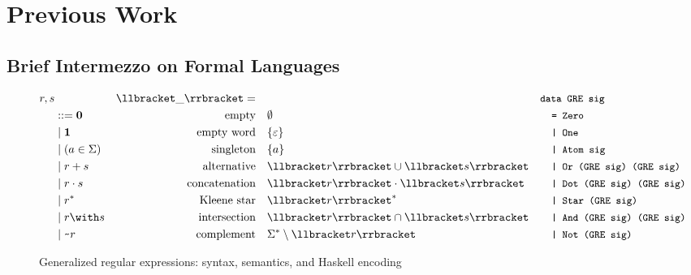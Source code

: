 \section{Previous Work}
\subsection{Brief Intermezzo on Formal Languages}
\label{sec:research-question}

\begin{figure*}[!bt]
  \centering
  \begin{minipage}{1.0\linewidth}
  \begin{align*}
    r, s & \vspace{10cm}\ &\Lang{\_}=\quad &  &
                             \makebox[1em][l]{\code{data GRE sig}}\\
         & ::= \Rnull & \ltext{empty}
                        & \emptyset
                           &&\code{= Zero}\\
         & \mid \Rempty & \ltext{empty word}
                        & \{ \varepsilon \}
                           && \code{| One}\\
         & \mid (a \in \Sigma) & \ltext{singleton}
                        &  \{ a \}
                           && \code{| Atom sig} \\
         & \mid \Runion rs & \ltext{alternative}
                        &  \Lang{r} \cup \Lang{s}
                           && \code{| Or (GRE sig) (GRE sig)}\\
         & \mid \Rconcat rs & \ltext{concatenation}
                        &  \Lang r \cdot \Lang s
                           && \code{| Dot (GRE sig) (GRE sig)}\\
         & \mid \Rstar r & \ltext{Kleene star}
                        & \Lang r^* 
                           && \code{| Star (GRE sig)}\\
         & \mid \Rintersect rs & \ltext{intersection}
                        & \Lang r \cap \Lang s
                           && \code{| And (GRE sig) (GRE sig)}\\
         & \mid \Rcomplement r & \ltext{complement}
                        & \Sigma^* \setminus \Lang r
                           && \code{| Not (GRE sig)}
  \end{align*}
  \end{minipage}
  \caption{Generalized regular expressions: syntax, semantics, and Haskell encoding}
  \label{fig:generalized-regular-expressions}
\end{figure*}

